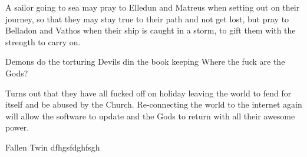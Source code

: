 A sailor going to sea may pray to Elledun and Matreus when setting out on their journey, so that they may stay true to their path and not get lost, but pray to Belladon and Vathos when their ship is caught in a storm, to gift them with the strength to carry on.

Demons do the torturing
Devils din the book keeping
Where the fuck are the Gods?

Turns out that they have all fucked off on holiday leaving the world to fend for itself and be abused by the Church. Re-connecting the world to the internet again will allow the software to update and the Gods to return with all their awesome power.


\begin{DndSidebar}{Fallen Twin}
 dfhgsfdghfsgh
\end{DndSidebar}

\smallskip

\bigskip


\clearpage